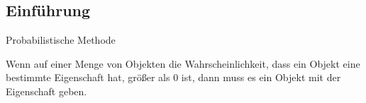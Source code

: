 
\begin{frame}[plain]
	\section{Einführung}
\end{frame}

\begin{frame}{Probabilistische Methode}
	
	\begin{framed}
		Wenn auf einer Menge von Objekten die Wahrscheinlichkeit, dass ein Objekt eine bestimmte Eigenschaft hat, größer als 0 ist, dann muss es ein Objekt mit der Eigenschaft geben. \cite{Aigner2010}
	\end{framed}
	
	\hspace{0.5cm}
	

\end{frame}
